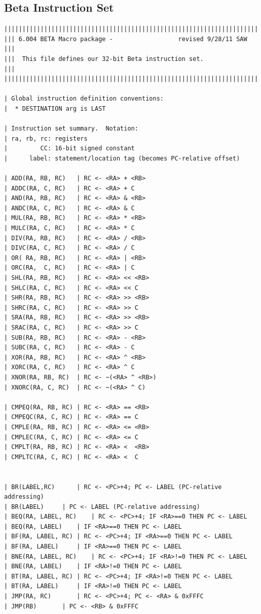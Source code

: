 \documentclass{article}
\begin{document}
\subsection{Beta Instruction Set}
\begin{lstlisting}
||||||||||||||||||||||||||||||||||||||||||||||||||||||||||||||||||||||||
||| 6.004 BETA Macro package -                  revised 9/28/11 SAW  |||
|||  This file defines our 32-bit Beta instruction set.              |||
||||||||||||||||||||||||||||||||||||||||||||||||||||||||||||||||||||||||

| Global instruction definition conventions:
|  * DESTINATION arg is LAST

| Instruction set summary.  Notation:
| ra, rb, rc: registers
|         CC: 16-bit signed constant
|      label: statement/location tag (becomes PC-relative offset)

| ADD(RA, RB, RC)	| RC <- <RA> + <RB>
| ADDC(RA, C, RC)	| RC <- <RA> + C
| AND(RA, RB, RC)	| RC <- <RA> & <RB>
| ANDC(RA, C, RC)	| RC <- <RA> & C
| MUL(RA, RB, RC)	| RC <- <RA> * <RB>
| MULC(RA, C, RC)	| RC <- <RA> * C
| DIV(RA, RB, RC)	| RC <- <RA> / <RB>
| DIVC(RA, C, RC)	| RC <- <RA> / C
| OR( RA, RB, RC)	| RC <- <RA> | <RB>
| ORC(RA,  C, RC)	| RC <- <RA> | C
| SHL(RA, RB, RC)	| RC <- <RA> << <RB>
| SHLC(RA, C, RC)	| RC <- <RA> << C
| SHR(RA, RB, RC)	| RC <- <RA> >> <RB>
| SHRC(RA, C, RC)	| RC <- <RA> >> C
| SRA(RA, RB, RC)	| RC <- <RA> >> <RB>
| SRAC(RA, C, RC)	| RC <- <RA> >> C
| SUB(RA, RB, RC)	| RC <- <RA> - <RB>
| SUBC(RA, C, RC)	| RC <- <RA> - C
| XOR(RA, RB, RC)	| RC <- <RA> ^ <RB>
| XORC(RA, C, RC)	| RC <- <RA> ^ C
| XNOR(RA, RB, RC)	| RC <- ~(<RA> ^ <RB>)
| XNORC(RA, C, RC)	| RC <- ~(<RA> ^ C)

| CMPEQ(RA, RB, RC)	| RC <- <RA> == <RB>
| CMPEQC(RA, C, RC)	| RC <- <RA> == C
| CMPLE(RA, RB, RC)	| RC <- <RA> <= <RB>
| CMPLEC(RA, C, RC)	| RC <- <RA> <= C
| CMPLT(RA, RB, RC)	| RC <- <RA> <  <RB>
| CMPLTC(RA, C, RC)	| RC <- <RA> <  C


| BR(LABEL,RC)		| RC <- <PC>+4; PC <- LABEL (PC-relative addressing)
| BR(LABEL)		| PC <- LABEL (PC-relative addressing)
| BEQ(RA, LABEL, RC)	| RC <- <PC>+4; IF <RA>==0 THEN PC <- LABEL
| BEQ(RA, LABEL)	| IF <RA>==0 THEN PC <- LABEL
| BF(RA, LABEL, RC)	| RC <- <PC>+4; IF <RA>==0 THEN PC <- LABEL
| BF(RA, LABEL)		| IF <RA>==0 THEN PC <- LABEL
| BNE(RA, LABEL, RC)	| RC <- <PC>+4; IF <RA>!=0 THEN PC <- LABEL
| BNE(RA, LABEL)	| IF <RA>!=0 THEN PC <- LABEL
| BT(RA, LABEL, RC)	| RC <- <PC>+4; IF <RA>!=0 THEN PC <- LABEL
| BT(RA, LABEL)		| IF <RA>!=0 THEN PC <- LABEL
| JMP(RA, RC)		| RC <- <PC>+4; PC <- <RA> & 0xFFFC
| JMP(RB)		| PC <- <RB> & 0xFFFC


\end{lstlisting}
\end{document}
